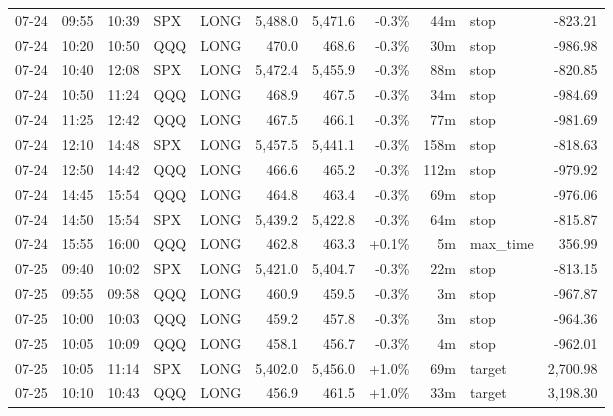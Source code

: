 \documentclass[11pt,a4paper,twoside]{article}
\begin{document}
\begin{center}
\begin{longtable}{>{\color{txtmain}}l l l l l r r r r >{\color{txtmain}}l r}
07-24 & 09:55 & 10:39 & SPX & LONG & 5,488.0 & 5,471.6 & \textcolor{lossred}{-0.3\%} & 44m & stop & \textcolor{lossred}{-823.21} \\
07-24 & 10:20 & 10:50 & QQQ & LONG & 470.0 & 468.6 & \textcolor{lossred}{-0.3\%} & 30m & stop & \textcolor{lossred}{-986.98} \\
07-24 & 10:40 & 12:08 & SPX & LONG & 5,472.4 & 5,455.9 & \textcolor{lossred}{-0.3\%} & 88m & stop & \textcolor{lossred}{-820.85} \\
07-24 & 10:50 & 11:24 & QQQ & LONG & 468.9 & 467.5 & \textcolor{lossred}{-0.3\%} & 34m & stop & \textcolor{lossred}{-984.69} \\
07-24 & 11:25 & 12:42 & QQQ & LONG & 467.5 & 466.1 & \textcolor{lossred}{-0.3\%} & 77m & stop & \textcolor{lossred}{-981.69} \\
07-24 & 12:10 & 14:48 & SPX & LONG & 5,457.5 & 5,441.1 & \textcolor{lossred}{-0.3\%} & 158m & stop & \textcolor{lossred}{-818.63} \\
07-24 & 12:50 & 14:42 & QQQ & LONG & 466.6 & 465.2 & \textcolor{lossred}{-0.3\%} & 112m & stop & \textcolor{lossred}{-979.92} \\
07-24 & 14:45 & 15:54 & QQQ & LONG & 464.8 & 463.4 & \textcolor{lossred}{-0.3\%} & 69m & stop & \textcolor{lossred}{-976.06} \\
07-24 & 14:50 & 15:54 & SPX & LONG & 5,439.2 & 5,422.8 & \textcolor{lossred}{-0.3\%} & 64m & stop & \textcolor{lossred}{-815.87} \\
07-24 & 15:55 & 16:00 & QQQ & LONG & 462.8 & 463.3 & \textcolor{wingreen}{+0.1\%} & 5m & max\_time & \textcolor{wingreen}{356.99} \\
07-25 & 09:40 & 10:02 & SPX & LONG & 5,421.0 & 5,404.7 & \textcolor{lossred}{-0.3\%} & 22m & stop & \textcolor{lossred}{-813.15} \\
07-25 & 09:55 & 09:58 & QQQ & LONG & 460.9 & 459.5 & \textcolor{lossred}{-0.3\%} & 3m & stop & \textcolor{lossred}{-967.87} \\
07-25 & 10:00 & 10:03 & QQQ & LONG & 459.2 & 457.8 & \textcolor{lossred}{-0.3\%} & 3m & stop & \textcolor{lossred}{-964.36} \\
07-25 & 10:05 & 10:09 & QQQ & LONG & 458.1 & 456.7 & \textcolor{lossred}{-0.3\%} & 4m & stop & \textcolor{lossred}{-962.01} \\
07-25 & 10:05 & 11:14 & SPX & LONG & 5,402.0 & 5,456.0 & \textcolor{wingreen}{+1.0\%} & 69m & target & \textcolor{wingreen}{2,700.98} \\
07-25 & 10:10 & 10:43 & QQQ & LONG & 456.9 & 461.5 & \textcolor{wingreen}{+1.0\%} & 33m & target & \textcolor{wingreen}{3,198.30} \\

\end{longtable}
\end{center}
\end{document}
